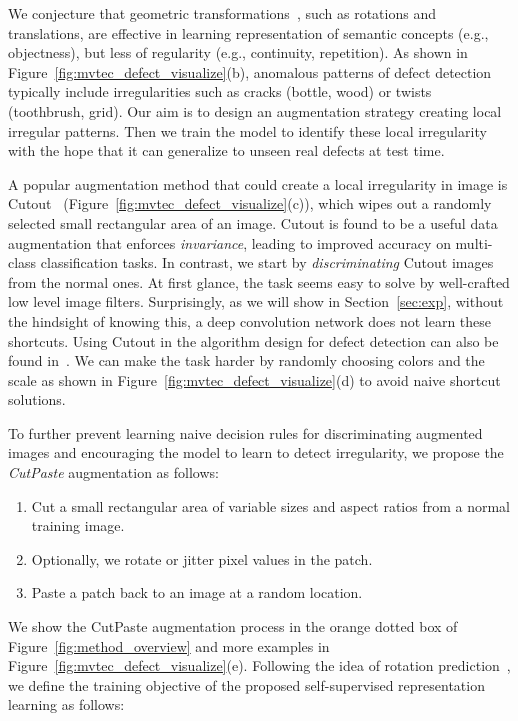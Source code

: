 \documentclass[final]{cvpr}
\begin{document}
We conjecture that geometric transformations~\cite{golan2018deep,hendrycks2019using,bergman2020classification}, such as rotations and translations, are effective in learning representation of semantic concepts (e.g., objectness), but less of regularity (e.g., continuity, repetition). As shown in  Figure~\ref{fig:mvtec_defect_visualize}(b), anomalous patterns of defect detection typically include irregularities such as cracks (bottle, wood) or twists (toothbrush, grid). Our aim is to design an augmentation strategy creating local irregular patterns. Then we train the model to identify these local irregularity with the hope that it can generalize to unseen real defects at test time. 


A popular augmentation method that could create a local irregularity in image is Cutout~\cite{devries2017improved} (Figure~\ref{fig:mvtec_defect_visualize}(c)), which wipes out a randomly selected small rectangular area of an image. Cutout is found to be a useful data augmentation that enforces \emph{invariance}, leading to improved accuracy on multi-class classification tasks. In contrast, we start by \emph{discriminating} Cutout images from the normal ones. 
At first glance, the task seems easy to solve by well-crafted low level image filters. Surprisingly, as we will show in Section~\ref{sec:exp}, without the hindsight of knowing this, a deep convolution network does not learn these shortcuts. Using Cutout in the algorithm design for defect detection can also be found in~\cite{liznerski2020explainable,tayeh2020distance}.  We can make the task harder by randomly choosing colors and the scale as shown in Figure~\ref{fig:mvtec_defect_visualize}(d) to avoid naive shortcut solutions. 


To further prevent learning naive decision rules for discriminating augmented images and encouraging the model to learn to detect irregularity, we propose the \emph{CutPaste} augmentation as follows:
\begin{enumerate}
    \setlength\itemsep{0em}
    \item Cut a small rectangular area of variable sizes and aspect ratios from a normal training image.
    \item Optionally, we rotate or jitter pixel values in the patch.
    \item Paste a patch back to an image at a random location.
\end{enumerate}
We show the CutPaste augmentation process in the orange dotted box of Figure~\ref{fig:method_overview} and more examples in Figure~\ref{fig:mvtec_defect_visualize}(e). Following the idea of rotation prediction~\cite{gidaris2018unsupervised}, we define the training objective of the proposed self-supervised representation learning as follows:
\end{document}
